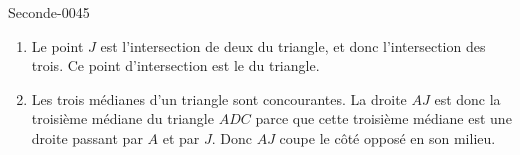 
\begin{corrige}{Seconde-0045}

    \begin{enumerate}
        \item
            Le point \( J\) est l'intersection de deux  du triangle, et donc l'intersection des trois. Ce point d'intersection est le \cite{VhTiRd} du triangle.
        \item
            Les trois médianes d'un triangle sont concourantes. La droite \( AJ\) est donc la troisième médiane du triangle \( ADC\) parce que cette troisième médiane est une droite passant par \( A\) et par \( J\). Donc \( AJ\) coupe le côté opposé en son milieu.
    \end{enumerate}

\end{corrige}
